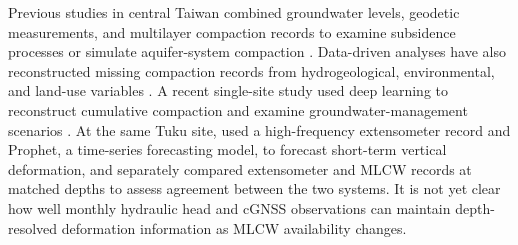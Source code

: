Previous studies in central Taiwan combined groundwater levels, geodetic measurements, and multilayer compaction records to examine subsidence processes or simulate aquifer-system compaction \citep{hung2012_mlcw, hung_measuring_2021}. Data-driven analyses have also reconstructed missing compaction records from hydrogeological, environmental, and land-use variables \citep{liu_reconstructing_2023}. A recent single-site study used deep learning to reconstruct cumulative compaction and examine groundwater-management scenarios \citep{liu_deep_2025}. At the same Tuku site, \citet{hung2025_realtime} used a high-frequency extensometer record and Prophet, a time-series forecasting model, to forecast short-term vertical deformation, and separately compared extensometer and MLCW records at matched depths to assess agreement between the two systems. It is not yet clear how well monthly hydraulic head and cGNSS observations can maintain depth-resolved deformation information as MLCW availability changes.

